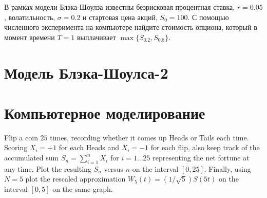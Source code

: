 \begin{problem}
В рамках модели Блэка-Шоулза известны безрисковая процентная ставка, $r=0.05$, волатильность, $\sigma=0.2$ и стартовая цена акций, $S_0=100$. С помощью численного эксперимента на компьютере найдите стоимость опциона, который в момент времени $T=1$ выплачивает $\max\{ S_{0.2},S_{0.8}\}$.

\begin{sol}
\end{sol}
\end{problem}


\section{Модель Блэка-Шоулса-2}


\section{Компьютерное моделирование}

\begin{problem}
  Flip a coin $25$ times, recording whether it comes up Heads  or Tails each time.  Scoring $X_i = +1$ for each Heads and $X_i = -1$ for each flip, also keep track of the accumulated sum $S_n = \sum_{i=1}^n X_i$ for $i = 1 \dots 25$ representing the net fortune at any time.  Plot the resulting $S_n$ versus $n$ on the interval   $[0,25]$.  Finally, using $N=5$ plot the rescaled approximation  $W_5(t) = (1/\sqrt{5}) S(5t)$ on the interval $[0,5]$ on the same graph.

\begin{sol}
\end{sol}
\end{problem}





